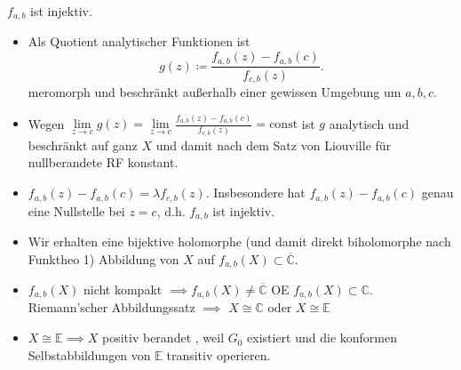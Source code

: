 \documentclass{beamer}
\newcommand{\C}{\mathbb{C}}
\newcommand{\E}{\mathbb{E}}
\begin{document}
    \begin{frame}
        \begin{lemma}
            $f_{a,b}$ ist injektiv.
        \end{lemma}
        \begin{itemize}
            \item Als Quotient analytischer Funktionen ist $$g(z) \coloneqq \frac{f_{a,b}(z)-f_{a,b}(c)}{f_{c,b}(z)}.$$ meromorph und beschränkt außerhalb einer gewissen Umgebung um $a,b,c$. 
            \item Wegen $\lim\limits_{z \to c} g(z) = \lim\limits_{z \to c} \frac{f_{a,b}(z) - f_{a,b}(c)}{f_{c,b}(z)} = \mathrm{const}$ ist $g$ analytisch und beschränkt auf ganz $X$ und damit nach dem Satz von Liouville für nullberandete RF konstant.
            \item $f_{a,b}(z) - f_{a,b}(c) = \lambda f_{c,b}(z)$. Insbesondere hat $f_{a,b}(z) - f_{a,b}(c)$ genau eine Nullstelle bei $z = c$, d.h. $f_{a,b}$ ist injektiv.
        \end{itemize}
    \end{frame}
    \begin{frame}
        \begin{itemize}
            \item Wir erhalten eine bijektive holomorphe (und damit direkt biholomorphe nach Funktheo 1) Abbildung von $X$ auf $f_{a,b}(X) \subset \overline{\C}$.
            \item $f_{a,b}(X)$ nicht kompakt $\implies f_{a,b}(X) \neq \overline{\C}$  OE $f_{a,b}(X) \subset \C$. Riemann'scher Abbildungssatz $\implies$  $X \cong \C$ oder $X \cong \E$
            \item $X \cong \E \implies X$ positiv berandet \Lightning, weil $G_0$ existiert und die konformen Selbstabbildungen von $\E$ transitiv operieren.
        \end{itemize}
    \end{frame}
\end{document}
